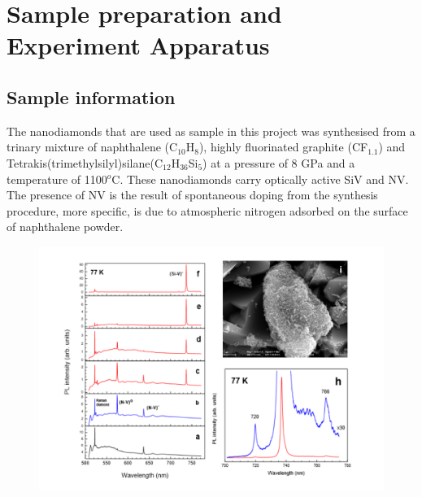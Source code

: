 \chapter[Sample preparation and Experiment Apparatus]{Sample preparation and Experiment Apparatus} %

\label{Chapter2} %

\section{Sample information}
The nanodiamonds that are used as sample in this project was synthesised from a trinary mixture of naphthalene (C$_{10}$H$_{8}$), highly fluorinated graphite (CF$_{1.1}$) and Tetrakis(trimethylsilyl)silane(C$_{12}$H$_{36}$Si$_{5}$) at a pressure of 8 GPa and a temperature of 1100$^{o}$C. These nanodiamonds carry optically active SiV and NV. The presence of NV is the result of spontaneous doping from the synthesis procedure, more specific, is due to atmospheric nitrogen adsorbed on the surface of naphthalene powder.
\begin{figure}[h]
\centering
\includegraphics[width=1\linewidth]{Figures/pic/diamondinfo}
\caption{}
\label{fig:diamondinfo}
\end{figure}
\FloatBarrier

